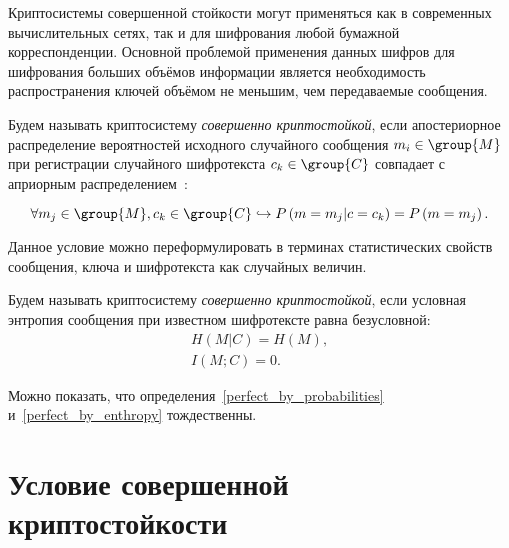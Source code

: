 Криптосистемы совершенной стойкости могут применяться как в современных вычислительных сетях, так и для шифрования любой бумажной корреспонденции. Основной проблемой применения данных шифров для шифрования больших объёмов информации является необходимость распространения ключей объёмом не меньшим, чем передаваемые сообщения.

\begin{definition}\label{perfect_by_probabilities}
Будем называть криптосистему \emph{совершенно криптостойкой}, если апостериорное распределение вероятностей исходного случайного сообщения $m_i \in \group{M}$ при регистрации случайного шифротекста $c_k \in \group{C}$ совпадает с априорным распределением~\cite{Gultyaeva:2010}:

	\[\forall m_j \in \group{M}, c_k \in \group{C} \hookrightarrow P \left( m = m_j | c = c_k \right) = P \left( m = m_j \right).\]
\end{definition}

Данное условие можно переформулировать в терминах статистических свойств сообщения, ключа и шифротекста как случайных величин.

\begin{definition}\label{perfect_by_enthropy}
Будем называть криптосистему \emph{совершенно криптостойкой}, если условная энтропия сообщения при известном шифротексте равна безусловной:
\begin{gather*}
	H \left( M | C \right) = H \left( M \right),\\
	I \left( M; C \right) = 0.
\end{gather*}
\end{definition}

Можно показать, что определения~\ref{perfect_by_probabilities} и~\ref{perfect_by_enthropy} тождественны.

\section[Условие]{Условие совершенной криптостойкости}

